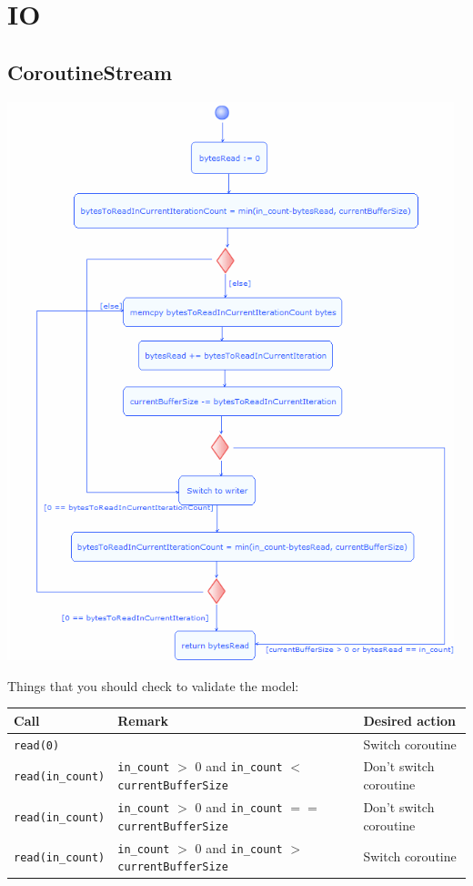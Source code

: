 \documentclass[10pt]{scrbook}
\begin{document}
\section{IO}

\subsection{CoroutineStream}

\includegraphics[width=130mm]{uml/CoroutineStream_read_activity.png}

Things that you should check to validate the model:

\begin{tabular}{| l | l | l |}
\hline
Call & Remark & Desired action \\
\hline
\hline
  \texttt{read(0)} & & Switch coroutine \\
\hline
  \texttt{read(in\_count)} & \texttt{in\_count} $>$ 0 and \texttt{in\_count} $<$ \texttt{currentBufferSize} & Don't switch coroutine \\
\hline
  \texttt{read(in\_count)} & \texttt{in\_count} $>$ 0 and \texttt{in\_count} $==$ \texttt{currentBufferSize} & Don't switch coroutine \\
\hline
  \texttt{read(in\_count)} & \texttt{in\_count} $>$ 0 and \texttt{in\_count} $>$ \texttt{currentBufferSize} & Switch coroutine \\
\hline
\end{tabular}
\end{document}
